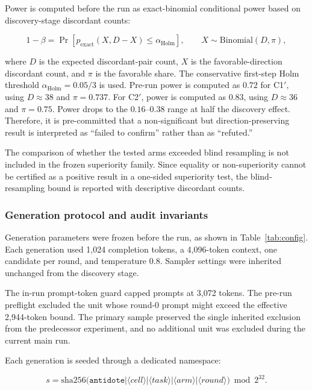 \documentclass{article}
\numberwithin{equation}{section}  %
\theoremstyle{definition}
\newcommand{\Cone}{C1$'$}
\newcommand{\Ctwo}{C2$'$}
\begin{document}
Power is computed before the run as exact-binomial conditional power based on discovery-stage
discordant counts:

\begin{equation}\label{eq:power}
1-\beta=
\Pr\!\left[
p_{\mathrm{exact}}(X,D-X)
\le \alpha_{\mathrm{Holm}}
\right],
\qquad
X\sim\mathrm{Binomial}(D,\pi),
\end{equation}

where $D$ is the expected discordant-pair count, $X$ is the favorable-direction discordant
count, and $\pi$ is the favorable share. The conservative first-step Holm threshold
$\alpha_{\mathrm{Holm}}=0.05/3$ is used. Pre-run power is computed as $0.72$ for \Cone{},
using $D\approx38$ and $\pi=0.737$. For \Ctwo{}, power is computed as $0.83$, using
$D\approx36$ and $\pi=0.75$. Power drops to the $0.16$--$0.38$ range at half the discovery
effect. Therefore, it is pre-committed that a non-significant but direction-preserving result
is interpreted as ``failed to confirm'' rather than as ``refuted.''

The comparison of whether the tested arms exceeded blind resampling is not included in the
frozen superiority family. Since equality or non-superiority cannot be certified as a positive
result in a one-sided superiority test, the blind-resampling bound is reported with
descriptive discordant counts.

\subsubsection{Generation protocol and audit invariants}
\label{sec:protocol}

Generation parameters were frozen before the run, as shown in Table~\ref{tab:config}. Each
generation used 1{,}024 completion tokens, a 4{,}096-token context, one candidate per round,
and temperature $0.8$. Sampler settings were inherited unchanged from the discovery stage.

The in-run prompt-token guard capped prompts at 3{,}072 tokens. The pre-run preflight excluded
the unit whose round-0 prompt might exceed the effective 2{,}944-token bound. The primary
sample preserved the single inherited exclusion from the predecessor experiment, and no
additional unit was excluded during the current main run.

Each generation is seeded through a dedicated namespace:

\begin{equation}\label{eq:seed}
s=
\mathrm{sha256}\!\big(
\texttt{antidote|}
\langle\textit{cell}\rangle|
\langle\textit{task}\rangle|
\langle\textit{arm}\rangle|
\langle\textit{round}\rangle
\big)
\bmod 2^{32}.
\end{equation}
\end{document}
